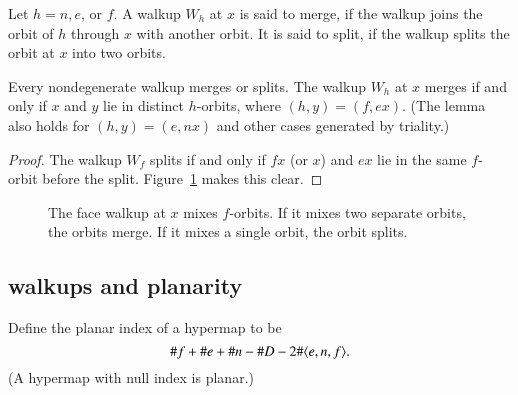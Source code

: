 \begin{definition}\label{def:merge-split} Let $h=n,e$, or $f$.
A walkup $W_h$ at $x$ is said to merge,
if the walkup joins the orbit of $h$ through $x$ with another orbit.  
It is said to split, if the walkup splits the
orbit at $x$ into two orbits.
\end{definition}

\begin{lemma}\label{lemma:merge-split} 
Every nondegenerate walkup merges or splits.
The walkup $W_h$ at $x$ merges if and only if $x$ and $y$  lie
in distinct $h$-orbits, where $(h,y)=(f,e x)$.  
(The lemma also holds for $(h,y)=(e,n x)$ and other cases generated
by triality.)
\end{lemma}

\begin{proof} The walkup $W_f$ splits if and only if $f x$ 
(or $x$)
and $e x$ lie in the same $f$-orbit before the split. 
Figure~\ref{fig:split} makes this clear.
\end{proof}


\begin{figure}[htb]
  \centering
  \caption{The face walkup at $x$ mixes $f$-orbits.  If it mixes
  two separate 
  orbits, the orbits merge.  If it mixes a single orbit, 
  the orbit splits.}
  \label{fig:split}
\end{figure}


\subsection{walkups and planarity}

\begin{definition} Define the planar index of a hypermap to be
$$\# f + \# e + \# n - \# D - 2\# \langle e,n,f\rangle.$$
(A hypermap with null index is planar.)
\end{definition}

